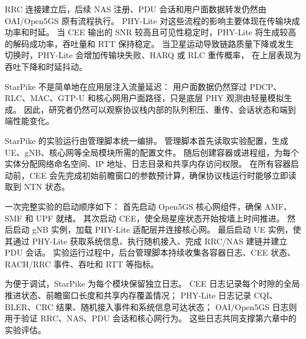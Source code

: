 
RRC 连接建立后，后续 NAS 注册、PDU 会话和用户面数据转发仍然由 OAI/Open5GS 原有流程执行。
PHY-Lite 对这些流程的影响主要体现在传输块成功率和时延。
当 CEE 输出的 SNR 较高且可见性稳定时，PHY-Lite 将生成较高的解码成功率，吞吐量和 RTT 保持稳定。
当卫星运动导致链路质量下降或发生切换时，PHY-Lite 会增加传输块失败、HARQ 或 RLC 重传概率，
在上层表现为吞吐下降和时延抖动。

StarPike 不是简单地在应用层注入流量延迟：
用户面数据仍然穿过 PDCP、RLC、MAC、GTP-U 和核心网用户面路径，只是底层 PHY 观测由轻量模拟生成。
因此，研究者仍然可以观察协议栈内部的队列积压、重传、会话状态和端到端性能变化。


StarPike 的实验运行由管理脚本统一编排。
管理脚本首先读取实验配置，生成 UE、gNB、核心网等全局模块所需的配置文件。
随后创建容器或进程组，为每个实体分配网络命名空间、IP 地址、日志目录和共享内存访问权限。
在所有容器启动前，CEE 会先完成初始前瞻窗口的参数预计算，确保协议栈运行时能够立即读取到 NTN 状态。

一次完整实验的启动顺序如下：
首先启动 Open5GS 核心网组件，确保 AMF、SMF 和 UPF 就绪。
其次启动 CEE，使全局星座状态开始按墙上时间推进。
然后启动 gNB 实例，加载 PHY-Lite 适配层并连接核心网。
最后启动 UE 实例，使其通过 PHY-Lite 获取系统信息、执行随机接入、完成 RRC/NAS 建链并建立 PDU 会话。
实验运行过程中，后台管理脚本持续收集各容器日志、CEE 状态、RACH/RRC 事件、吞吐和 RTT 等指标。

为便于调试，StarPike 为每个模块保留独立日志。
CEE 日志记录每个时隙的全局推进状态、前瞻窗口长度和共享内存覆盖情况；
PHY-Lite 日志记录 CQI、BLER、CRC 结果、随机接入事件和系统信息可达状态；
OAI/Open5GS 日志则用于验证 RRC、NAS、PDU 会话和核心网行为。
这些日志共同支撑第六章中的实验评估。




